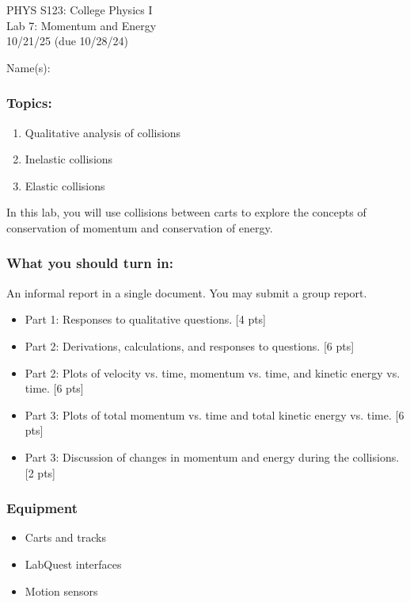\documentclass[11pt,letterpaper]{article}
\newcounter{question}[section]
\begin{document}
\setlength{\parindent}{0in}


\begin{flushright}
PHYS S123: College Physics I\\
Lab 7: Momentum and Energy\\
10/21/25 (due 10/28/24)
\end{flushright}

Name(s):\\


\subsubsection*{Topics:}
\begin{enumerate}
\setlength{\parskip}{3pt}
\item Qualitative analysis of collisions
\item Inelastic collisions
\item Elastic collisions
\end{enumerate}

In this lab, you will use collisions between carts to explore the concepts of conservation of momentum and conservation of energy.

\subsubsection*{What you should turn in:} 
An informal report in a single document. You may submit a group report.
\begin{itemize}
\setlength{\parskip}{3pt}
\item Part 1: Responses to qualitative questions. [4 pts]
\item Part 2: Derivations, calculations, and responses to questions. [6 pts]
\item Part 2: Plots of velocity vs. time, momentum vs. time, and kinetic energy vs. time. [6 pts]
\item Part 3: Plots of total momentum vs. time and total kinetic energy vs. time. [6 pts]
\item Part 3: Discussion of changes in momentum and energy during the collisions. [2 pts]
\end{itemize}

\subsubsection*{Equipment}
\begin{itemize}
\setlength{\parskip}{3pt}
\item Carts and tracks
\item LabQuest interfaces
\item Motion sensors
\end{itemize}
\end{document}
